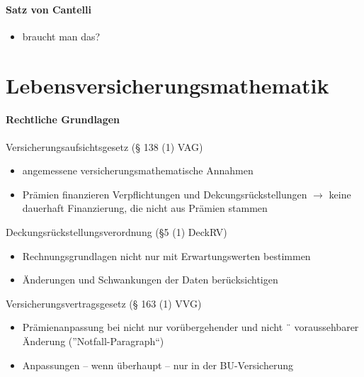 \documentclass[12pt]{report}
\theoremstyle{dotless}
\theoremstyle{definition}
\begin{document}
\subsubsection{Satz von Cantelli}
\begin{itemize}
	\item braucht man das?
\end{itemize}


































\chapter{Lebensversicherungsmathematik}

\subsubsection{Rechtliche Grundlagen}
Versicherungsaufsichtsgesetz (§ 138 (1) VAG)
\begin{itemize}
\item angemessene versicherungsmathematische Annahmen
\item Prämien finanzieren Verpflichtungen und Dekcungsrückstellungen $\rightarrow$ keine dauerhaft Finanzierung, die nicht aus Prämien stammen
\end{itemize}

Deckungsrückstellungsverordnung (§5 (1) DeckRV)
\begin{itemize}
\item Rechnungsgrundlagen nicht nur mit Erwartungswerten bestimmen
\item Änderungen und Schwankungen der Daten berücksichtigen
\end{itemize}

Versicherungsvertragsgesetz (§ 163 (1) VVG)
\begin{itemize}
\item Prämienanpassung bei nicht nur vorübergehender und nicht ¨
voraussehbarer Änderung  (”Notfall-Paragraph“)
\item Anpassungen – wenn überhaupt – nur in der BU-Versicherung
\end{itemize}
\end{document}

